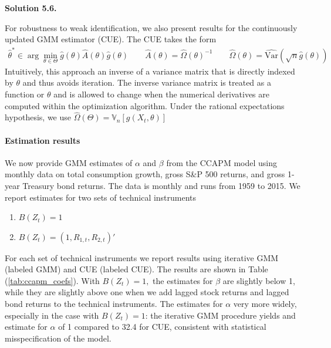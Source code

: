 \documentclass[11pt]{article}
\newenvironment{solution}[1]
    {\bigskip\noindent\textbf{Solution #1.} \par}
    {\medskip}
\begin{document}
\begin{solution}{5.6}
For robustness to weak identification, we also present results for the continuously updated GMM estimator (CUE). The CUE takes the form 
\begin{align*}
    \hat{\theta}^* \in \arg\min_{\theta\in\Theta}\hat{g}(\theta)\hat{A}(\theta)\hat{g}(\theta) \qquad \hat{A}(\theta) = \hat{\Omega}(\theta)^{-1} \qquad \hat{\Omega}(\theta) = \hat{\text{Var}}(\sqrt{n}\hat{g}(\theta))
\end{align*}
Intuitively, this approach an inverse of a variance matrix that is directly indexed by $\theta$ and thus avoids iteration. The inverse variance matrix is treated as a function or $\theta$ and is allowed to change when the numerical derivatives are computed within the optimization algorithm. Under the rational expectations hypothesis, we use $\hat{\Omega}(\Theta) = \mathbb{V}_n[g(X_t,\theta)]$


\paragraph{Estimation results} We now provide GMM estimates of $\alpha$ and $\beta$ from the CCAPM model using monthly data on total consumption growth, gross S\&P 500 returns, and gross 1-year Treasury bond returns. The data is monthly and runs from 1959 to 2015. We report estimates for two sets of technical instruments 
\begin{enumerate}[label=(\alph*),leftmargin=2cm]
    \item $B(Z_t) = 1$
    \item $B(Z_t) = (1,R_{1,t},R_{2,t})'$
\end{enumerate}
For each set of technical instruments we report results using iterative GMM (labeled GMM) and CUE (labeled CUE). The results are shown in Table (\ref{tab:ccapm_coefs}). With $B(Z_t) = 1,$ the estimates for $\beta$ are slightly below 1, while they are slightly above one when we add lagged stock returns and lagged bond returns to the technical instruments. The estimates for $\alpha$ very more widely, especially in the case with $B(Z_t) = 1$: the iterative GMM procedure yields and estimate for $\alpha$ of 1 compared to 32.4 for CUE, consistent with statistical misspecification of the model.

\begin{table}[H]
    \centering
    \caption{GMM estimation of $\alpha$ and $\beta$}
    \label{tab:ccapm_coefs}
    
\end{table}


\end{solution}
\end{document}
